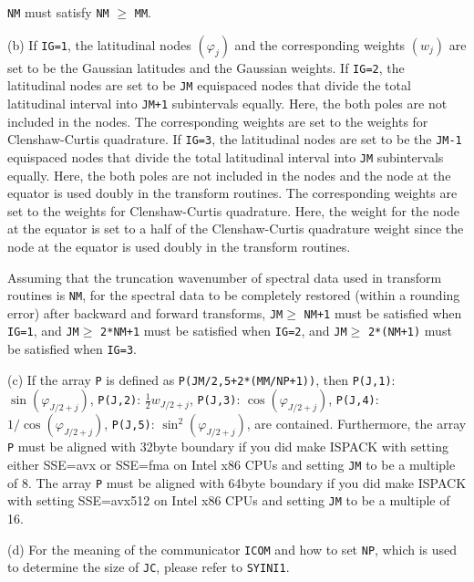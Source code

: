 \documentclass[a4paper]{scrartcl}
\begin{document}
\begin{enumerate}
\texttt{NM} must satisfy 
\texttt{NM} $\ge$ \texttt{MM}.

(b) If \texttt{IG=1}, the latitudinal nodes $(\varphi_j)$
and the corresponding weights $(w_j)$ are set to be the
Gaussian latitudes and the Gaussian weights.
If \texttt{IG=2}, the latitudinal nodes are set to be 
\texttt{JM} equispaced nodes that divide the total latitudinal
interval into \texttt{JM+1} subintervals equally. Here, 
the both poles are not included in the nodes.
The corresponding weights are set to the weights for
Clenshaw-Curtis quadrature.
If \texttt{IG=3}, the latitudinal nodes are set to be the
\texttt{JM-1} equispaced nodes that divide the total latitudinal
interval into \texttt{JM} subintervals equally. Here, 
the both poles are not included in the nodes and
the node at the equator is used doubly in the transform routines.
The corresponding weights are set to the weights for
Clenshaw-Curtis quadrature. Here, the weight for the node
at the equator is set to a half of the Clenshaw-Curtis quadrature
weight since
the node at the equator is used doubly in the transform routines.

Assuming that the truncation wavenumber of spectral data
used in transform routines is \texttt{NM},
for the spectral data to be completely restored (within a rounding
error) after backward and forward transforms,
\texttt{JM}$\ge$ \texttt{NM+1} must be satisfied when
\texttt{IG=1}, and
\texttt{JM}$\ge$ \texttt{2*NM+1} must be satisfied 
when \texttt{IG=2},
and
\texttt{JM}$\ge$ \texttt{2*(NM+1)} must be satisfied 
when \texttt{IG=3}.

(c) If the array \texttt{P} is defined as 
\texttt{P(JM/2,5+2*(MM/NP+1))}, then 
   \texttt{P(J,1)}:  $\sin(\varphi_{J/2+j})$,
   \texttt{P(J,2)}:  $\frac12 w_{J/2+j}$, 
   \texttt{P(J,3)}:  $\cos(\varphi_{J/2+j})$,
   \texttt{P(J,4)}:  $1/\cos(\varphi_{J/2+j})$,
   \texttt{P(J,5)}:  $\sin^2(\varphi_{J/2+j})$,
are contained. Furthermore, the array \texttt{P}
must be aligned with 32byte boundary
if you did make ISPACK with setting either SSE=avx or SSE=fma
on Intel x86 CPUs and setting \texttt{JM} to be a multiple of 8.
The array \texttt{P} must be aligned with 64byte boundary
if you did make ISPACK with setting SSE=avx512
on Intel x86 CPUs and setting \texttt{JM} to be a multiple of 16.

(d) For the meaning of the communicator \texttt{ICOM} and
how to set \texttt{NP}, which is used to determine the size of 
\texttt{JC}, please refer to \texttt{SYINI1}.

\end{enumerate}
\end{document}
